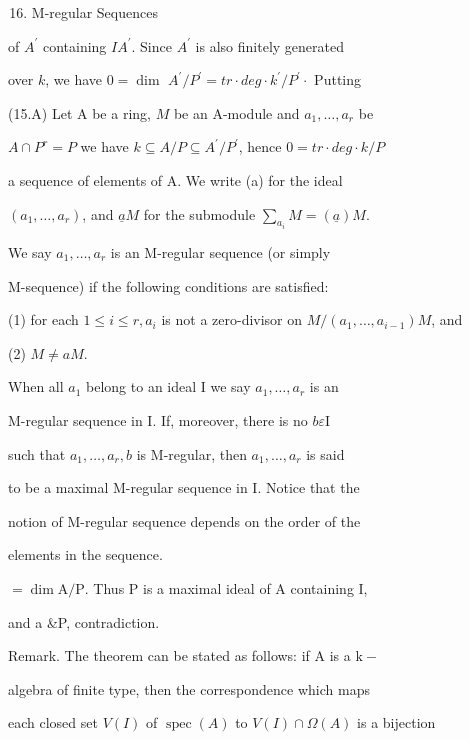 \begin{enumerate}
  \setcounter{enumi}{15}
  \item M-regular Sequences
\end{enumerate}
of $A^{\prime}$ containing $I A^{\prime}$. Since $A^{\prime}$ is also finitely generated

over $k$, we have $0=\operatorname{dim~} A^{\prime} / P^{\prime}=t r \cdot d e g \cdot k^{\prime} / P^{\prime} \cdot$ Putting

(15.A) Let A be a ring, $M$ be an A-module and $a_{1}, \ldots, a_{r}$ be

$A \cap P^{r}=P$ we have $k \subseteq A / P \subseteq A^{\prime} / P^{\prime}$, hence $0=t r \cdot d e g \cdot k / P$

a sequence of elements of A. We write (a) for the ideal

$\left(a_{1}, \ldots, a_{r}\right)$, and $\underline{a} M$ for the submodule $\sum_{a_{i}} M=(\underline{a}) M$.

We say $a_{1}, \ldots, a_{r}$ is an M-regular sequence (or simply

M-sequence) if the following conditions are satisfied:

(1) for each $1 \leqslant i \leqslant r, a_{i}$ is not a zero-divisor on $M /\left(a_{1}, \ldots, a_{i-1}\right) M$, and

(2) $M \neq a M$.

When all $a_{1}$ belong to an ideal I we say $a_{1}, \ldots, a_{r}$ is an

M-regular sequence in I. If, moreover, there is no $b \varepsilon \mathrm{I}$

such that $a_{1}, \ldots, a_{r}, b$ is M-regular, then $a_{1}, \ldots, a_{r}$ is said

to be a maximal M-regular sequence in I. Notice that the

notion of M-regular sequence depends on the order of the

elements in the sequence.

$=\operatorname{dim} \mathrm{A} / \mathrm{P}$. Thus $\mathrm{P}$ is a maximal ideal of $\mathrm{A}$ containing I,

and a \&P, contradiction.

Remark. The theorem can be stated as follows: if $\mathrm{A}$ is a $\mathrm{k}-$

algebra of finite type, then the correspondence which maps

each closed set $V(I)$ of $\operatorname{spec}(A)$ to $V(I) \cap \Omega(A)$ is a bijection


